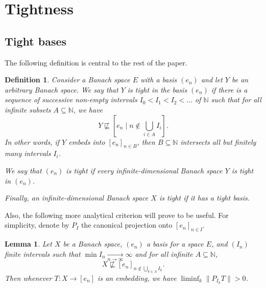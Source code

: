 \documentclass[10pt]{amsart}
\numberwithin{equation}{section}
\newtheorem{lemme}[thm]{Lemma}
\newtheorem{defi} [thm] {Definition}
\begin{document}
\section{Tightness}
\subsection{Tight bases}
The following definition is central to the rest of the paper.
\begin{defi}
Consider a Banach space $E$ with a basis $(e_n)$ and let $Y$ be an arbitrary
Banach space. We say that $Y$ is {\em tight in the basis} $(e_n)$ if there is a
sequence of successive non-empty intervals $I_0<I_1<I_2<\ldots$ of ${\mathbb N}$ such
that for all infinite subsets $A\subseteq {\mathbb N}$, we have
$$
Y\not\sqsubseteq [e_n{ \; \big| \;} n\notin \bigcup_{i\in A}I_i].
$$
In other words,  if $Y$ embeds into $[e_n]_{n\in B}$, then $B\subseteq {\mathbb N}$ intersects all but finitely many intervals $I_i$.

We say that $(e_n)$ is {\em tight} if every infinite-dimensional Banach space $Y$ is tight in $(e_n)$.

Finally, an infinite-dimensional Banach space $X$ is {\em tight} if it has a tight basis.
\end{defi}
Also, the following more analytical criterion will prove to be useful. For
simplicity, denote by $P_I$ the canonical projection onto $[e_n]_{n\in I}$.
\begin{lemme}\label{projection tightness}
Let $X$ be a Banach space, $(e_n)$ a basis for a space $E$, and $(I_n)$ finite
intervals such that $\min I_n{\mathop{\longrightarrow}\limits_{{n{\rightarrow} \infty}}}\infty$ and for all infinite
$A\subseteq {\mathbb N}$,
$$
X\not\sqsubseteq[e_n]_{n\notin\bigcup_{k\in A}I_k}.
$$
Then whenever $T\colon X{\rightarrow} [e_n]$ is an embedding, we have $\liminf_k {\lVert{P_{I_k}T}\rVert}>0$.
\end{lemme}
\end{document}

